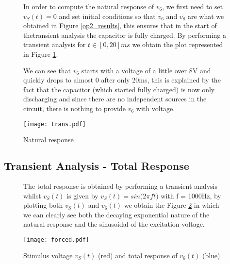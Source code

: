 \begin{figure}[h]
	\begin{minipage}[t]{.42\textwidth}
		\vspace{0pt}
		\hspace{12pt} In order to compute the natural response of $v_6$, we first need to set $v_S(t) = 0$ and set initial conditions so that $v_6$ and $v_8$ are what we obtained in Figure \ref{op2_results}, this ensures that in the start of thetransient analysis the capacitor is fully charged. By performing a transient analysis for $t \in [0, 20] ms$ we obtain the plot represented in Figure \ref{fig:sim_nat}.

		\hspace{12pt} We can see that $v_6$ starts with a voltage of a little over 8V and quickly drops to almost 0 after only 20ms, this is explained by the fact that the capacitor (which started fully charged) is now only discharging and since there are no independent sources in the circuit, there is nothing to provide $v_6$ with voltage.
	\end{minipage}
	\begin{minipage}[t]{.55\textwidth}
		\vspace{0pt}
		\centering
		\texttt{[image: trans.pdf]}
		\caption{Natural response}
		\label{fig:sim_nat}
	\end{minipage}
\end{figure}

\subsection{Transient Analysis - Total Response}

\begin{figure}[h]
	\begin{minipage}[t]{.42\textwidth}
		\vspace{0pt}
		\hspace{12pt} The total response is obtained by performing a transient analysis whilst $v_S(t)$ is given by $v_S(t) = sin(2\pi$$ft)$ with f = 1000Hz, by plotting both $v_S(t)$ and $v_6(t)$ we obtain the Figure \ref{fig:sim_total} in which we can clearly see both the decaying exponential nature of the natural response and the sinusoidal of the excitation voltage.
	\end{minipage}
	\begin{minipage}[t]{.55\textwidth}
		\vspace{0pt}
		\centering
		\texttt{[image: forced.pdf]}
		\caption{Stimulus voltage $v_S(t)$ (red) and total response of $v_6(t)$ (blue)}
		\label{fig:sim_total}
	\end{minipage}
\end{figure}

